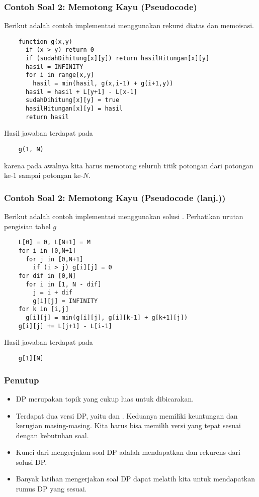 \begin{frame} [fragile]
\frametitle{Contoh Soal 2: Memotong Kayu (Pseudocode)}
  Berikut adalah contoh implementasi menggunakan rekursi diatas dan memoisasi.
  \begin{lstlisting}
    function g(x,y)
      if (x > y) return 0
      if (sudahDihitung[x][y]) return hasilHitungan[x][y]
      hasil = INFINITY
      for i in range[x,y]
        hasil = min(hasil, g(x,i-1) + g(i+1,y))
      hasil = hasil + L[y+1] - L[x-1]
      sudahDihitung[x][y] = true
      hasilHitungan[x][y] = hasil
      return hasil
  \end{lstlisting}
  Hasil jawaban terdapat pada 
  \begin{lstlisting}
    g(1, N)
  \end{lstlisting}
  karena pada awalnya kita harus memotong seluruh titik potongan dari potongan ke-$1$ sampai potongan ke-$N$.
\end{frame}

\begin{frame} [fragile]
\frametitle{Contoh Soal 2: Memotong Kayu (Pseudocode (lanj.))}
  Berikut adalah contoh implementasi menggunakan solusi . Perhatikan urutan pengisian tabel $g$
  \begin{lstlisting}
    L[0] = 0, L[N+1] = M
    for i in [0,N+1]
      for j in [0,N+1]
        if (i > j) g[i][j] = 0
    for dif in [0,N]
      for i in [1, N - dif]
        j = i + dif
        g[i][j] = INFINITY
	for k in [i,j]
	  g[i][j] = min(g[i][j], g[i][k-1] + g[k+1][j])
	g[i][j] += L[j+1] - L[i-1]
  \end{lstlisting}
  Hasil jawaban terdapat pada
  \begin{lstlisting}
    g[1][N]
  \end{lstlisting}
\end{frame}

\begin{frame}
\frametitle{Penutup}
\begin{itemize}
  \item DP merupakan topik yang cukup luas untuk dibicarakan.
  \item Terdapat dua versi DP, yaitu  dan . Keduanya memiliki keuntungan dan kerugian masing-masing. Kita harus bisa memilih versi yang tepat sesuai dengan kebutuhan soal.
  \item Kunci dari mengerjakan soal DP adalah mendapatkan  dan rekurens dari solusi DP. 
  \item Banyak latihan mengerjakan soal DP dapat melatih kita untuk mendapatkan rumus DP yang sesuai.
\end{itemize}
\end{frame}


